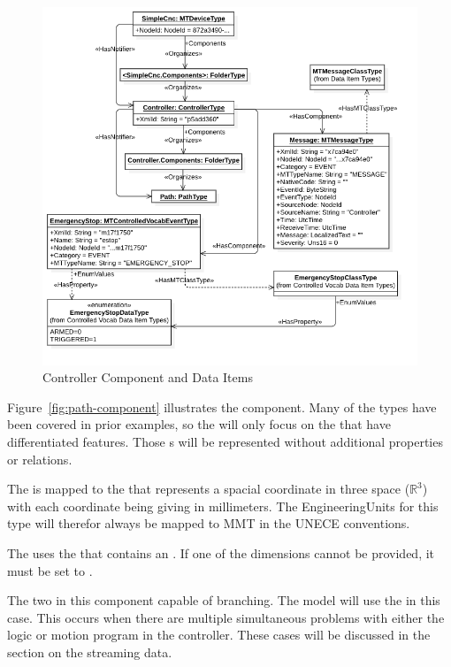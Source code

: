 \begin{figure}[ht]
    \centering
    \includegraphics[width=1.0\textwidth]{diagrams/mtconnect-mapping/controller-component.png}
    \caption{Controller Component and Data Items}
    \label{fig:controller-component}
\end{figure}

Figure~\ref{fig:path-component} illustrates the  component. Many of the  types have been covered in prior examples, so the  will only focus on the  that have differentiated features. Those s will be represented without additional properties or relations.

The  is mapped to the  that represents a spacial coordinate in three space ($\mathbb{R}^{3}$) with each coordinate being giving in millimeters. The EngineeringUnits for this type will therefor always be mapped to MMT in the UNECE conventions.

The  uses the  that contains an  . If one of the dimensions cannot be provided, it must be set to .

The two  in this component capable of branching. The model will use the  in this case. This occurs when there are multiple simultaneous problems with either the logic or motion program in the controller. These cases will be discussed in the section on the streaming data.

